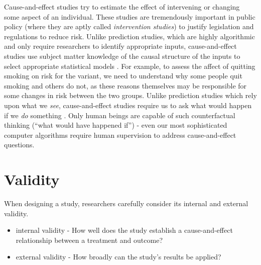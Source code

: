 \documentclass[]{book}
\begin{document}
Cause-and-effect studies try to estimate the effect of intervening or changing some aspect of an individual. These studies are tremendously important in public policy (where they are aptly called \emph{intervention studies}) to justify legislation and regulations to reduce risk. Unlike prediction studies, which are highly algorithmic and only require researchers to identify appropriate inputs, cause-and-effect studies use subject matter knowledge of the causal structure of the inputs to select appropriate statistical models \citep{hernan2019second}. For example, to assess the affect of quitting smoking on risk for the variant, we need to understand why some people quit smoking and others do not, as these reasons themselves may be responsible for some changes in risk between the two groups. Unlike prediction studies which rely upon what we \emph{see}, cause-and-effect studies require us to ask what would happen if we \emph{do} something \citep{pearl2018book}. Only human beings are capable of such counterfactual thinking (``what would have happened if'') - even our most sophisticated computer algorithms require human supervision to address cause-and-effect questions.

\hypertarget{validity}{%
\section{Validity}\label{validity}}

When designing a study, researchers carefully consider its internal and external validity.

\begin{itemize}
\item
  internal validity - How well does the study establish a cause-and-effect relationship between a treatment and outcome?
\item
  external validity - How broadly can the study's results be applied?
\end{itemize}
\end{document}

